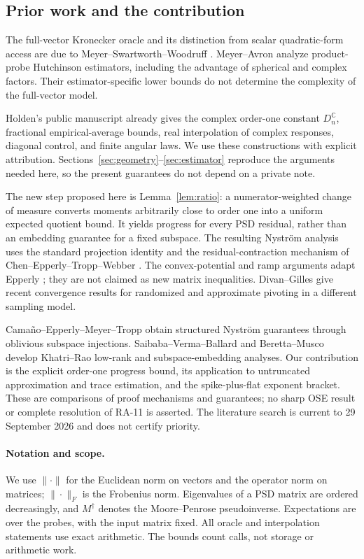 \documentclass[11pt,a4paper]{article}
\theoremstyle{definition}\newtheorem{definition}[theorem]{Definition}
\theoremstyle{remark}\newtheorem{remark}[theorem]{Remark}
\numberwithin{equation}{section}
\newcommand{\C}{\mathbb C}
\begin{document}
\subsection{Prior work and the contribution}
The full-vector Kronecker oracle and its distinction from scalar
quadratic-form access are due to Meyer--Swartworth--Woodruff \cite{MSW}.
Meyer--Avron \cite{MA} analyze product-probe Hutchinson estimators, including
the advantage of spherical and complex factors. Their estimator-specific
lower bounds do not determine the complexity of the full-vector model.

Holden's public manuscript \cite{Holden} already gives the complex
order-one constant \(D_n^{\C}\), fractional empirical-average bounds,
real interpolation of complex responses, diagonal control, and finite
angular laws. We use these constructions with explicit attribution.
Sections~\ref{sec:geometry}--\ref{sec:estimator} reproduce the arguments
needed here, so the present guarantees do not depend on a private note.

The new step proposed here is Lemma~\ref{lem:ratio}: a numerator-weighted
change of measure converts moments arbitrarily close to order one into a
uniform expected quotient bound. It yields progress for every PSD
residual, rather than an embedding guarantee for a fixed subspace.
The resulting Nystr\"om analysis uses the standard projection identity
and the residual-contraction mechanism of Chen--Epperly--Tropp--Webber
\cite{CETW}. The convex-potential and ramp arguments adapt
Epperly \cite[Lemma~4.2]{Epperly}; they are not claimed as new matrix
inequalities. Divan--Gilles \cite{DG} give recent convergence results for
randomized and approximate pivoting in a different sampling model.

Cama\~no--Epperly--Meyer--Tropp \cite{CEMT} obtain structured Nystr\"om
guarantees through oblivious subspace injections. Saibaba--Verma--Ballard
\cite{SVB} and Beretta--Musco \cite{BM} develop Khatri--Rao low-rank and
subspace-embedding analyses. Our contribution is the explicit
order-one progress bound, its application to untruncated approximation
and trace estimation, and the spike-plus-flat exponent bracket.
These are comparisons of proof mechanisms and guarantees; no sharp
OSE result or complete resolution of RA-11 is asserted. The literature
search is current to 29 September 2026 and does not certify priority.

\paragraph{Notation and scope.}
We use \(\|\cdot\|\) for the Euclidean norm on vectors and the operator
norm on matrices; \(\|\cdot\|_F\) is the Frobenius norm.
Eigenvalues of a PSD matrix are ordered decreasingly, and
\(M^\dagger\) denotes the Moore--Penrose pseudoinverse. Expectations
are over the probes, with the input matrix fixed. All oracle and
interpolation statements use exact arithmetic. The bounds count calls,
not storage or arithmetic work.
\end{document}
